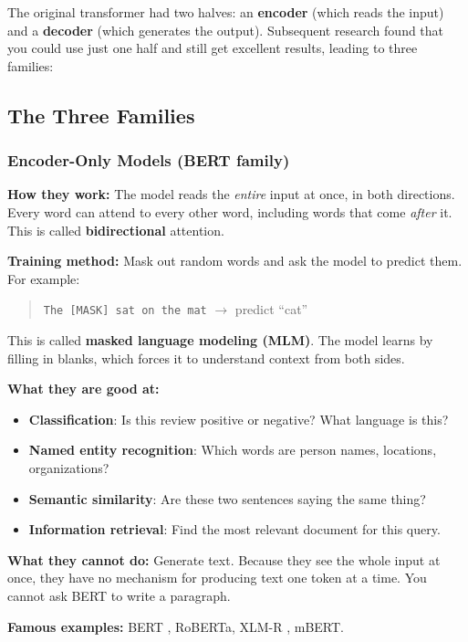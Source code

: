 \documentclass[11pt,a4paper]{article}
\begin{document}
The original transformer had two halves: an \textbf{encoder} (which reads the input) and a \textbf{decoder} (which generates the output). Subsequent research found that you could use just one half and still get excellent results, leading to three families:

\subsection{The Three Families}

\subsubsection{Encoder-Only Models (BERT family)}

\textbf{How they work:} The model reads the \emph{entire} input at once, in both directions. Every word can attend to every other word, including words that come \emph{after} it. This is called \textbf{bidirectional} attention.

\textbf{Training method:} Mask out random words and ask the model to predict them. For example:

\begin{quote}
\texttt{The [MASK] sat on the mat} $\rightarrow$ predict ``cat''
\end{quote}

This is called \textbf{masked language modeling (MLM)}. The model learns by filling in blanks, which forces it to understand context from both sides.

\textbf{What they are good at:}
\begin{itemize}
    \item \textbf{Classification}: Is this review positive or negative? What language is this?
    \item \textbf{Named entity recognition}: Which words are person names, locations, organizations?
    \item \textbf{Semantic similarity}: Are these two sentences saying the same thing?
    \item \textbf{Information retrieval}: Find the most relevant document for this query.
\end{itemize}

\textbf{What they cannot do:} Generate text. Because they see the whole input at once, they have no mechanism for producing text one token at a time. You cannot ask BERT to write a paragraph.

\textbf{Famous examples:} BERT \citep{devlin2019bert}, RoBERTa, XLM-R \citep{conneau2020unsupervised}, mBERT.
\end{document}
